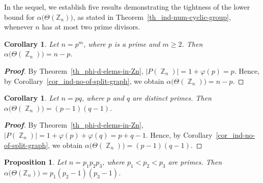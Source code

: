 \documentclass{amsart}
\theoremstyle{plain}
\newtheorem{proposition}[theorem]{Proposition}
\newtheorem{corollary}[theorem]{Corollary}
\theoremstyle{definition}
\DeclareMathOperator{\Z}{\mathbb{Z}}
\begin{document}
In the sequel, we establish five results demonstrating the tightness of the lower bound for $\alpha\bigl(\Theta(\mathbb{Z}_n)\bigr)$, as stated in Theorem~\ref{th_ind-num-cyclic-group}, whenever $n$ has at most two prime divisors.

\begin{corollary}
Let $n = p^m$, where $p$ is a prime and $m\geq 2$. Then $\alpha\bigl(\Theta(\Z_n)\bigr) = n-p$. 
\end{corollary}

\begin{proof}[\textbf{Proof}]
By Theorem~\ref{th_phi-d-elems-in-Zn}, $|P(\Z_n)| = 1 + \varphi(p) = p$. Hence, by Corollary~\ref{cor_ind-no-of-split-graph}, we obtain $\alpha\bigl(\Theta(\Z_n)\bigr) =  n-p$.
\end{proof}


\begin{corollary}
Let $n = pq$, where $p$ and $q$ are distinct primes. Then $\alpha\bigl(\Theta(\Z_n)\bigr) = (p-1)(q-1)$. 
\end{corollary}

\begin{proof}[\textbf{Proof}]
By Theorem~\ref{th_phi-d-elems-in-Zn}, $|P(\Z_n)| = 1 + \varphi(p) +\varphi(q) = p+q-1$. Hence, by Corollary~\ref{cor_ind-no-of-split-graph}, we obtain $\alpha\bigl(\Theta(\Z_n)\bigr) =  (p-1)(q-1)$.
\end{proof}


\begin{proposition}
Let $n= p_1p_2p_3$, where $p_1<p_2<p_3$ are primes. Then
	$\alpha\bigl(\Theta(\mathbb{Z}_{n})\bigr)= p_1 (p_2-1)(p_3-1)$.
\end{proposition}
\end{document}
